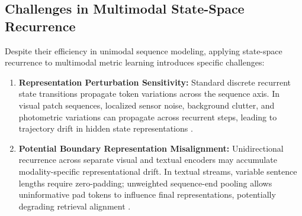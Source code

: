 \documentclass[pdflatex,sn-mathphys-num]{sn-jnl}%
\begin{document}
\subsection{Challenges in Multimodal State-Space Recurrence}
Despite their efficiency in unimodal sequence modeling, applying state-space recurrence to multimodal metric learning introduces specific challenges:
\begin{enumerate}
    \item \textbf{Representation Perturbation Sensitivity:} Standard discrete recurrent state transitions propagate token variations across the sequence axis. In visual patch sequences, localized sensor noise, background clutter, and photometric variations can propagate across recurrent steps, leading to trajectory drift in hidden state representations \cite{he2016deep,hendrycks2019benchmarking}.
    \item \textbf{Potential Boundary Representation Misalignment:} Unidirectional recurrence across separate visual and textual encoders may accumulate modality-specific representational drift. In textual streams, variable sentence lengths require zero-padding; unweighted sequence-end pooling allows uninformative pad tokens to influence final representations, potentially degrading retrieval alignment \cite{devlin2018bert,faghri2017vse++}.
\end{enumerate}
\end{document}

